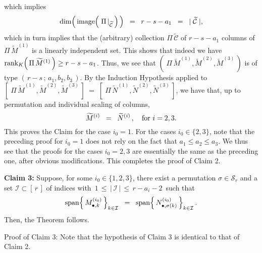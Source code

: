 which implies
\begin{equation*}
\dim\!\left(\,\textnormal{image}\!\left(\,\left.\Pi\,\right\vert_{\widetilde{\mathcal{C}}}\,\right)\,\right)
\;\; = \;\; r - s - a_{1}
\;\; = \;\; \vert\;\widetilde{\mathcal{C}}\;\vert,
\end{equation*}
which in turn implies that the (arbitrary) collection $\Pi\,\widetilde{\mathcal{C}}$ of $r - s - a_{1}$ columns of
$\Pi\,\widetilde{M}^{(1)}$ is a linearly independent set.
This shows that indeed we have $\textnormal{rank}_{K}\!\left(\,\Pi\,\widetilde{M}^{(1)}\,\right) \geq r - s - a_{1}$.
Thus, we see that $\left(\;\Pi\,\widetilde{M}^{(1)},\widetilde{M}^{(2)},\widetilde{M}^{(3)}\,\right)$
is of type $\left(\,r-s\,;\,a_{1},b_{2},b_{3}\,\right)$.
By the Induction Hypothesis applied to
$\left[\;\Pi\,\widetilde{M}^{(1)},\widetilde{M}^{(2)},\widetilde{M}^{(3)}\,\right]
\; = \; \left[\;\Pi\,\widetilde{N}^{(1)},\widetilde{N}^{(2)},\widetilde{N}^{(3)}\,\right]$,
we have that, up to permutation and individual scaling of columns,
\begin{equation*}
\widetilde{M}^{(i)} \;\; = \;\; \widetilde{N}^{(i)}\,,
\quad\textnormal{for $i = 2,3$}.
\end{equation*}
This proves the Claim for the case $i_{0} = 1$.
For the cases $i_{0} \in \{2,3\}$, note that the preceding proof for $i_{0} = 1$ does not rely
on the fact that $a_{1} \leq a_{2} \leq a_{3}$.
We thus see that the proofs for the cases $i_{0} = 2,3$
are essentially the same as the preceding one, after obvious modifications.
This completes the proof of Claim 2.


\vskip 0.5cm
\begin{center}
\begin{minipage}{6.0in}
\textbf{Claim 3:}
\vskip 0.025cm
\noindent
Suppose, for some $i_{0} \in \{1,2,3\}$, there exist a permutation $\sigma \in \mathcal{S}_{r}$
and a set $\mathcal{I} \subset \left[\,r\,\right]$ of indices with
\,$1 \,\leq\, \left\vert\,\mathcal{I}\,\right\vert \,\leq\, r - a_{i} - 2$\, such that
\begin{equation*}
\textnormal{span}\!\left\{\,M^{(i_{0})}_{\bullet,k}\,\right\}_{k\in\mathcal{I}}
\;\; = \;\;
\textnormal{span}\!\left\{\,N^{(i_{0})}_{\bullet,\sigma(k)}\,\right\}_{k\in\mathcal{I}}.
\end{equation*}
Then, the Theorem follows.
\end{minipage}
\end{center}
Proof of Claim 3:\; Note that the hypothesis of Claim 3 is identical to that of Claim 2.

